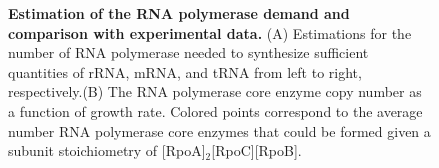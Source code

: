 \begin{figure}
        \caption{\textbf{Estimation of the RNA polymerase demand and
        comparison with experimental data.} (A) Estimations for the number of
        RNA polymerase needed to synthesize sufficient quantities of rRNA, mRNA,
        and tRNA from left to right, respectively.(B) The RNA
        polymerase core enzyme copy number as a function of growth rate. Colored
        points correspond to the average number RNA polymerase core enzymes that
        could be formed given a subunit stoichiometry of
        [RpoA]$_2$[RpoC][RpoB].} \label{fig:RNA_synthesis}

        \label{figsupp:sigma_70}

\end{figure}
